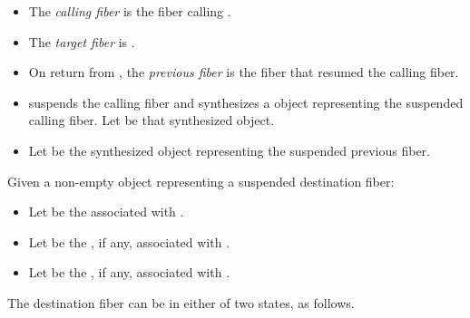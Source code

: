 \begin{itemize}
    \item The \emph{calling fiber} is the fiber calling \resumewith.
    \item The \emph{target fiber} is \thefiber{\state}.
    \item On return from \resumewith, the \emph{previous fiber} is the fiber that
          resumed the calling fiber.
    \item \resumewith suspends the calling fiber and synthesizes
          a \fiber object representing the suspended calling fiber. Let
           be that synthesized \fiber object.
    \item Let  be the synthesized \fiber object representing the
          suspended previous fiber.
\end{itemize}

Given a non-empty \fiber object  representing a suspended
destination fiber:

\begin{itemize}
    \item Let  be the  associated with .
    \item Let  be the , if any, associated with .
    \item Let  be the , if any, associated with .
\end{itemize}

The destination fiber can be in either of two states, as follows.

